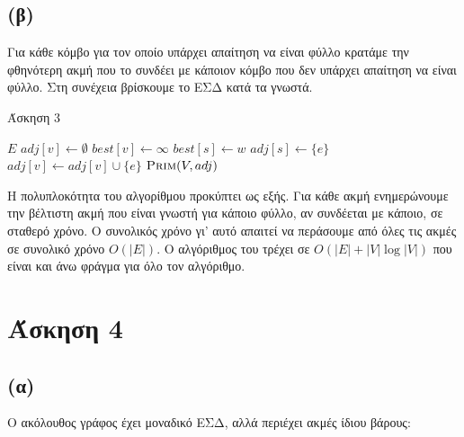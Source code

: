 \documentclass[11pt,a4paper,oneside]{report}
\begin{document}
\subsection*{(β)}
Για κάθε κόμβο για τον οποίο υπάρχει απαίτηση να είναι φύλλο κρατάμε την φθηνότερη ακμή που το συνδέει με κάποιον κόμβο που δεν υπάρχει απαίτηση να είναι φύλλο. Στη συνέχεια βρίσκουμε το ΕΣΔ κατά τα γνωστά.

\begin{algorithm}[H]
\caption{\textgreek{Άσκηση 3}}
\begin{algorithmic}[1]

	    \State \Return $E$
	\EndIf
        \State $adj[ v ] \gets \emptyset$
        \State $best[ v ] \gets \infty$
    \EndFor
            		    \State $best[ s ] \gets w$
        	    	    \State $adj[ s ] \gets \{ e \}$
	    	        \EndIf
    	        \EndIf
        	\EndFor
        \Else
            \State $adj[ v ] \gets adj[ v ] \cup \{ e \}$
        \EndIf
    \EndFor
    \State \Return $\Call{Prim}{V, adj}$
\EndProcedure
\end{algorithmic}
\end{algorithm}

Η πολυπλοκότητα του αλγορίθμου προκύπτει ως εξής. Για κάθε ακμή ενημερώνουμε την βέλτιστη ακμή που είναι γνωστή για κάποιο φύλλο, αν συνδέεται με κάποιο, σε σταθερό χρόνο. Ο συνολικός χρόνο γι' αυτό απαιτεί να περάσουμε από όλες τις ακμές σε συνολικό χρόνο $O( |E| )$. Ο αλγόριθμος του  τρέχει σε $O(|E| + |V|\log|V|)$ που είναι και άνω φράγμα για όλο τον αλγόριθμο.

\section*{Άσκηση 4}
\subsection*{(α)}

Ο ακόλουθος γράφος έχει μοναδικό ΕΣΔ, αλλά περιέχει ακμές ίδιου βάρους:

\begin{figure}[ht]
	\centering
\end{figure}
\end{document}
